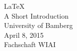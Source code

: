 \begin{center}
\Huge \LaTeX\\
\vspace{5mm} \LARGE A Short Introduction\\
\vspace{12mm} \Large University of Bamberg\\[5mm]
\large April 8, 2015\\
Fachschaft WIAI\normalsize \\
\end{center}
